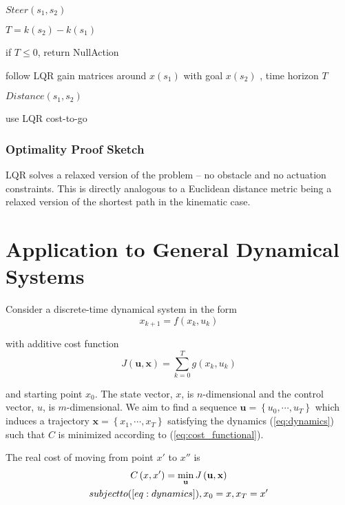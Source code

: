 \documentclass[letterpaper, 10pt, english, conference]{IEEEtran}
\begin{document}
$Steer(s_{1},s_{2})$

$T=k\left(s_{2}\right)-k\left(s_{1}\right)$

if $T\leq0$, return NullAction

follow LQR gain matrices around $x\left(s_{1}\right)$ with goal $x\left(s_{2}\right)$
, time horizon $T$

$Distance(s_{1},s_{2})$

use LQR cost-to-go


\subsubsection{Optimality Proof Sketch}

LQR solves a relaxed version of the problem -- no obstacle and no
actuation constraints. This is directly analogous to a Euclidean distance
metric being a relaxed version of the shortest path in the kinematic
case.


\section{Application to General Dynamical Systems}

Consider a discrete-time dynamical system in the form 
\begin{equation}
x_{k+1}=f\left(x_{k},u_{k}\right)\label{eq:dynamics}
\end{equation}


with additive cost function
\begin{equation}
J\left(\mathbf{u},\mathbf{x}\right)=\sum_{k=0}^{T}g\left(x_{k},u_{k}\right)\label{eq:cost_functional}
\end{equation}


and starting point $x_{0}$. The state vector, $x$, is $n$-dimensional
and the control vector, $u$, is $m$-dimensional. We aim to find
a sequence $ $$\mathbf{u}=\left\{ u_{0},\cdots,u_{T}\right\} $ which
induces a trajectory $\mathbf{x}=\left\{ x_{1},\cdots,x_{T}\right\} $
satisfying the dynamics (\ref{eq:dynamics}) such that $ $$C$ is
minimized according to (\ref{eq:cost_functional}).

The real cost of moving from point $x'$ to $x''$ is
\begin{multline*}
C\left(x,x'\right)=\min_{\mathbf{u}}J\left(\mathbf{u},\mathbf{x}\right)\\
\mbox{subject to (\ensuremath{\ref{eq:dynamics}}), \ensuremath{x_{0}=x}, \ensuremath{x_{T}=x'}}
\end{multline*}
\end{document}
